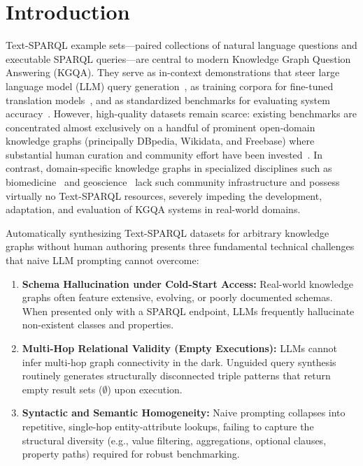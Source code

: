 \section{Introduction}
\label{sec:introduction}

Text-SPARQL example sets---paired collections of natural language questions and executable SPARQL queries---are central to modern Knowledge Graph Question Answering (KGQA). They serve as in-context demonstrations that steer large language model (LLM) query generation~\cite{wikisp2023,zahera2024generating,emonet2024llm,dabramo-etal-2025-investigating}, as training corpora for fine-tuned translation models~\cite{sgpt2022generative,neural2022machine}, and as standardized benchmarks for evaluating system accuracy~\cite{trivedi2017lc,dubey2019lcquad,usbeck2019qald,usbeck2021qald}. However, high-quality datasets remain scarce: existing benchmarks are concentrated almost exclusively on a handful of prominent open-domain knowledge graphs (principally DBpedia, Wikidata, and Freebase) where substantial human curation and community effort have been invested~\cite{usbeck2019qald,dubey2019lcquad,liu2024spinach}. In contrast, domain-specific knowledge graphs in specialized disciplines such as biomedicine~\cite{kgs2025biomedical} and geoscience~\cite{sockg2025} lack such community infrastructure and possess virtually no Text-SPARQL resources, severely impeding the development, adaptation, and evaluation of KGQA systems in real-world domains.

Automatically synthesizing Text-SPARQL datasets for arbitrary knowledge graphs without human authoring presents three fundamental technical challenges that naive LLM prompting cannot overcome:
\begin{enumerate}
    \item \textbf{Schema Hallucination under Cold-Start Access:} Real-world knowledge graphs often feature extensive, evolving, or poorly documented schemas. When presented only with a SPARQL endpoint, LLMs frequently hallucinate non-existent classes and properties.
    \item \textbf{Multi-Hop Relational Validity (Empty Executions):} LLMs cannot infer multi-hop graph connectivity in the dark. Unguided query synthesis routinely generates structurally disconnected triple patterns that return empty result sets ($\emptyset$) upon execution.
    \item \textbf{Syntactic and Semantic Homogeneity:} Naive prompting collapses into repetitive, single-hop entity-attribute lookups, failing to capture the structural diversity (e.g., value filtering, aggregations, optional clauses, property paths) required for robust benchmarking.
\end{enumerate}

